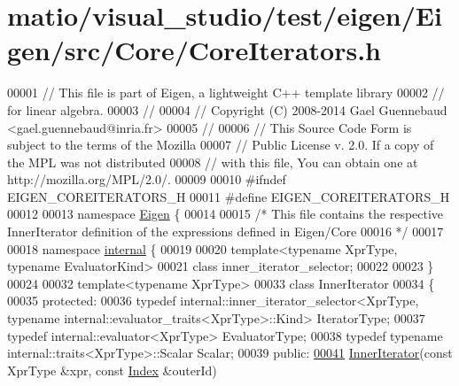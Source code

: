\hypertarget{matio_2visual__studio_2test_2eigen_2_eigen_2src_2_core_2_core_iterators_8h_source}{}\section{matio/visual\+\_\+studio/test/eigen/\+Eigen/src/\+Core/\+Core\+Iterators.h}
\label{matio_2visual__studio_2test_2eigen_2_eigen_2src_2_core_2_core_iterators_8h_source}

\begin{DoxyCode}
00001 \textcolor{comment}{// This file is part of Eigen, a lightweight C++ template library}
00002 \textcolor{comment}{// for linear algebra.}
00003 \textcolor{comment}{//}
00004 \textcolor{comment}{// Copyright (C) 2008-2014 Gael Guennebaud <gael.guennebaud@inria.fr>}
00005 \textcolor{comment}{//}
00006 \textcolor{comment}{// This Source Code Form is subject to the terms of the Mozilla}
00007 \textcolor{comment}{// Public License v. 2.0. If a copy of the MPL was not distributed}
00008 \textcolor{comment}{// with this file, You can obtain one at http://mozilla.org/MPL/2.0/.}
00009 
00010 \textcolor{preprocessor}{#ifndef EIGEN\_COREITERATORS\_H}
00011 \textcolor{preprocessor}{#define EIGEN\_COREITERATORS\_H}
00012 
00013 \textcolor{keyword}{namespace }\hyperlink{namespace_eigen}{Eigen} \{ 
00014 
00015 \textcolor{comment}{/* This file contains the respective InnerIterator definition of the expressions defined in Eigen/Core}
00016 \textcolor{comment}{ */}
00017 
00018 \textcolor{keyword}{namespace }\hyperlink{namespaceinternal}{internal} \{
00019 
00020 \textcolor{keyword}{template}<\textcolor{keyword}{typename} XprType, \textcolor{keyword}{typename} EvaluatorKind>
00021 \textcolor{keyword}{class }inner\_iterator\_selector;
00022 
00023 \}
00024 
00032 \textcolor{keyword}{template}<\textcolor{keyword}{typename} XprType>
00033 \textcolor{keyword}{class }InnerIterator
00034 \{
00035 \textcolor{keyword}{protected}:
00036   \textcolor{keyword}{typedef} internal::inner\_iterator\_selector<XprType, typename internal::evaluator\_traits<XprType>::Kind> 
      IteratorType;
00037   \textcolor{keyword}{typedef} internal::evaluator<XprType> EvaluatorType;
00038   \textcolor{keyword}{typedef} \textcolor{keyword}{typename} internal::traits<XprType>::Scalar Scalar;
00039 \textcolor{keyword}{public}:
\hyperlink{class_eigen_1_1_inner_iterator_abbcdcf4d5ecb4445654b7940204cb750}{00041}   \hyperlink{class_eigen_1_1_inner_iterator_abbcdcf4d5ecb4445654b7940204cb750}{InnerIterator}(\textcolor{keyword}{const} XprType &xpr, \textcolor{keyword}{const} \hyperlink{namespace_eigen_a62e77e0933482dafde8fe197d9a2cfde}{Index} &outerId)

\end{DoxyCode}
